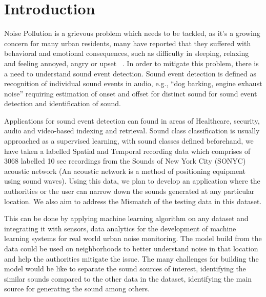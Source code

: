 \section{Introduction}
Noise Pollution is a grievous problem which needs to be tackled, as it’s a growing concern for many urban residents, many have reported that they suffered with behavioral and emotional consequences, such as difficulty in sleeping, relaxing and feeling annoyed, angry or upset ~\cite{1,2,3}. In order to mitigate this problem, there is a need to understand sound event detection. Sound event detection is defined as recognition of individual sound events in audio, e.g., “dog barking, engine exhaust noise” requiring estimation of onset and offset for distinct sound for sound event detection and identification of sound.

 Applications for sound event detection can found in areas of Healthcare, security, audio and video-based indexing and retrieval. Sound class classification is usually approached as a supervised learning, with sound classes defined beforehand, we have taken a labelled Spatial and Temporal recording data which comprises of 3068 labelled 10 sec recordings from the Sounds of New York City (SONYC) acoustic network (An acoustic network is a method of positioning equipment using sound waves). Using this data, we plan to develop an application where the authorities or the user can narrow down the sounds generated at any particular location. We also aim to address the Mismatch of the testing data in this dataset.


This can be done by applying machine learning algorithm on any dataset and integrating it with sensors, data analytics for the development of machine learning systems for real world urban noise monitoring. The model build from the data could be used on neighborhoods to better understand noise in that location and help the authorities mitigate the issue. The many challenges for building the model would be like to separate the sound sources of interest, identifying the similar sounds compared to the other data in the dataset, identifying the main source for generating the sound among others.     
